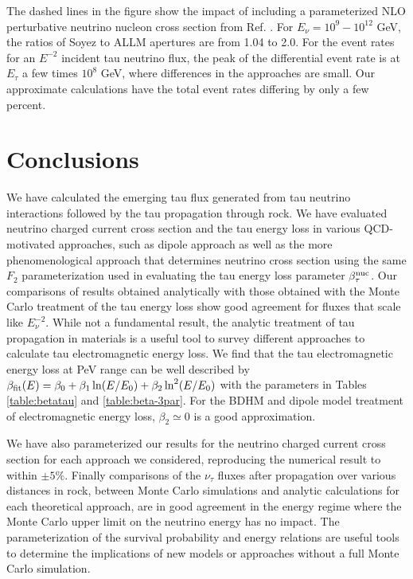 \documentclass[aps,10pt,twocolumn,tightenlines]{revtex4-1}
\begin{document}
The dashed lines in the figure show the impact of including a parameterized  NLO perturbative neutrino nucleon
cross section from Ref. \cite{Jeong:2010za}.
For $E_\nu=10^9-10^{12}$ GeV, the ratios of Soyez to ALLM apertures are from 1.04 to 2.0.
For the event rates for an $E^{-2}$ incident tau neutrino flux, the peak of the differential event rate is at $E_\tau$ a few times $10^8$ GeV, where differences in the approaches are small. Our approximate calculations have the total event rates differing by only a few percent.

\section{Conclusions}

We have calculated the emerging tau flux generated from tau 
neutrino interactions followed by the tau propagation through rock.  
We have evaluated neutrino charged current cross section and the 
tau energy loss in 
various QCD-motivated approaches, such as dipole approach as 
well as the more phenomenological approach that determines 
neutrino cross section using the same $F_2$ parameterization 
used in evaluating
the tau energy loss parameter $\beta_\tau^{\rm nuc}$.  Our comparisons of
results obtained analytically with those obtained with the 
Monte Carlo treatment of the tau energy loss show good agreement for fluxes that
scale like $E_\nu^{-2}$. While not a fundamental result, the analytic treatment of
tau propagation in materials is a useful tool to survey different approaches to calculate
tau electromagnetic energy loss.
We find that the tau electromagnetic energy loss at PeV range can 
be well described by $\beta_{\rm fit}(E) = 
\beta_0+\beta_1 \ln (E/E_0)+\beta_2 \ln^2 (E/E_0)$ 
with the parameters in Tables \ref{table:betatau} and \ref{table:beta-3par}. For the BDHM and
dipole model treatment of electromagnetic energy loss, $\beta_2\simeq 0$ is a good approximation.

We have also parameterized our results for the neutrino 
charged current cross section for each approach we considered, 
reproducing the numerical result to within $\pm 5\%$.  
Finally comparisons of the $\nu_\tau$ fluxes after propagation over 
various distances in rock, between Monte Carlo simulations and 
analytic calculations for each theoretical approach, are in 
good agreement in the energy regime where the Monte Carlo upper limit on the neutrino energy has no impact.  The parameterization of the survival probability and energy relations are useful
tools to determine the implications of new models or approaches without a full
Monte Carlo simulation. 
\end{document}
